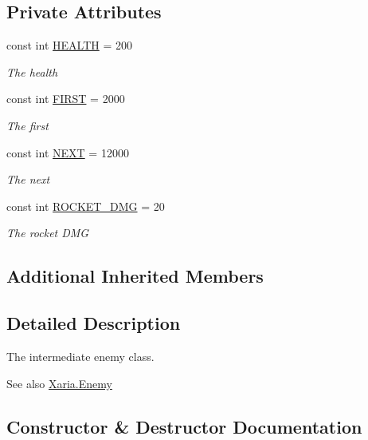 \subsection*{Private Attributes}
\begin{DoxyCompactItemize}
\item 
const int \hyperlink{classXaria_1_1Enemies_1_1Intermediate_afd31eb8d573bb115146c549c4e3cd00a}{H\+E\+A\+L\+TH} = 200
\begin{DoxyCompactList}\small\item\em The health \end{DoxyCompactList}\item 
const int \hyperlink{classXaria_1_1Enemies_1_1Intermediate_a820de1bc87b6f24a2c6e9e6184bdeb2d}{F\+I\+R\+ST} = 2000
\begin{DoxyCompactList}\small\item\em The first \end{DoxyCompactList}\item 
const int \hyperlink{classXaria_1_1Enemies_1_1Intermediate_a00f9a63b72051192c97c01b695b59bef}{N\+E\+XT} = 12000
\begin{DoxyCompactList}\small\item\em The next \end{DoxyCompactList}\item 
const int \hyperlink{classXaria_1_1Enemies_1_1Intermediate_a88a376ad9583015d85b73c70b3842df4}{R\+O\+C\+K\+E\+T\+\_\+\+D\+MG} = 20
\begin{DoxyCompactList}\small\item\em The rocket D\+MG \end{DoxyCompactList}\end{DoxyCompactItemize}
\subsection*{Additional Inherited Members}


\subsection{Detailed Description}
The intermediate enemy class. 

\begin{DoxySeeAlso}{See also}
\hyperlink{classXaria_1_1Enemy}{Xaria.\+Enemy}


\end{DoxySeeAlso}


\subsection{Constructor \& Destructor Documentation}
\mbox{\label{classXaria_1_1Enemies_1_1Intermediate_a49a6edfc96285296ab02fc225752de38}} 
